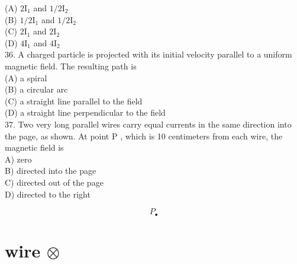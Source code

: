 \begin{enumerate}
(A) $2 \mathrm{I}_{1}$ and $1 / 2 \mathrm{I}_{2}$\\
(B) $1 / 2 \mathrm{I}_{1}$ and $1 / 2 \mathrm{I}_{2}$\\
(C) $2 \mathrm{I}_{1}$ and $2 \mathrm{I}_{2}$\\
(D) $4 \mathrm{I}_{1}$ and $4 \mathrm{I}_{2}$\\
36. A charged particle is projected with its initial velocity parallel to a uniform magnetic field. The resulting path is\\
(A) a spiral\\
(B) a circular arc\\
(C) a straight line parallel to the field\\
(D) a straight line perpendicular to the field\\
37. Two very long parallel wires carry equal currents in the same direction into the page, as shown. At point P , which is 10 centimeters from each wire, the magnetic field is\\
A) zero\\
B) directed into the page\\
C) directed out of the page\\
D) directed to the right

$$
P_{\bullet}
$$

\section*{wire $\otimes$}

\end{enumerate}
